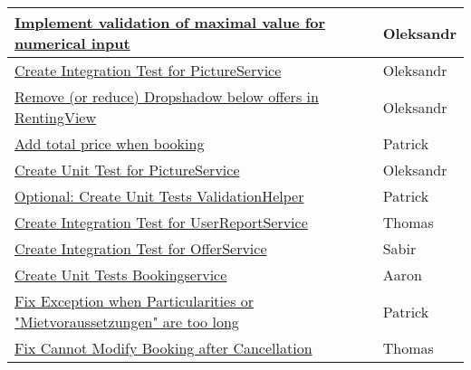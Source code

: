 \begin{tabular}{|p{}|p{1cm}|p{}|}
    \hline
	\href{https://gitlab.rz.uni-bamberg.de/swt/teaching/2021-ws/swt-swl-b/group-a/-/issues/145}{Implement validation of maximal value for numerical input} &   & Oleksandr \\

    \hline
	\href{https://gitlab.rz.uni-bamberg.de/swt/teaching/2021-ws/swt-swl-b/group-a/-/issues/145}{Create Integration Test for PictureService} &   & Oleksandr \\
    
    \hline
	\href{https://gitlab.rz.uni-bamberg.de/swt/teaching/2021-ws/swt-swl-b/group-a/-/issues/154}{Remove (or reduce) Dropshadow below offers in RentingView} &   & Oleksandr \\

    \hline
	\href{https://gitlab.rz.uni-bamberg.de/swt/teaching/2021-ws/swt-swl-b/group-a/-/issues/149}{Add total price when booking} &   & Patrick \\

    \hline
	\href{https://gitlab.rz.uni-bamberg.de/swt/teaching/2021-ws/swt-swl-b/group-a/-/issues/159}{Create Unit Test for PictureService} &   & Oleksandr \\

    \hline
	\href{https://gitlab.rz.uni-bamberg.de/swt/teaching/2021-ws/swt-swl-b/group-a/-/issues/126}{Optional: Create Unit Tests ValidationHelper} &   & Patrick \\

    \hline
	\href{https://gitlab.rz.uni-bamberg.de/swt/teaching/2021-ws/swt-swl-b/group-a/-/issues/165}{Create Integration Test for UserReportService} &   & Thomas \\

    \hline
	\href{https://gitlab.rz.uni-bamberg.de/swt/teaching/2021-ws/swt-swl-b/group-a/-/issues/163}{Create Integration Test for OfferService} &   & Sabir \\

    \hline
	\href{https://gitlab.rz.uni-bamberg.de/swt/teaching/2021-ws/swt-swl-b/group-a/-/issues/83}{Create Unit Tests Bookingservice} &   & Aaron \\

    \hline
	\href{https://gitlab.rz.uni-bamberg.de/swt/teaching/2021-ws/swt-swl-b/group-a/-/issues/169}{Fix Exception when Particularities or "Mietvoraussetzungen" are too long} &   & Patrick \\

    \hline
	\href{https://gitlab.rz.uni-bamberg.de/swt/teaching/2021-ws/swt-swl-b/group-a/-/issues/170}{Fix Cannot Modify Booking after Cancellation} &   & Thomas \\


\end{tabular}
